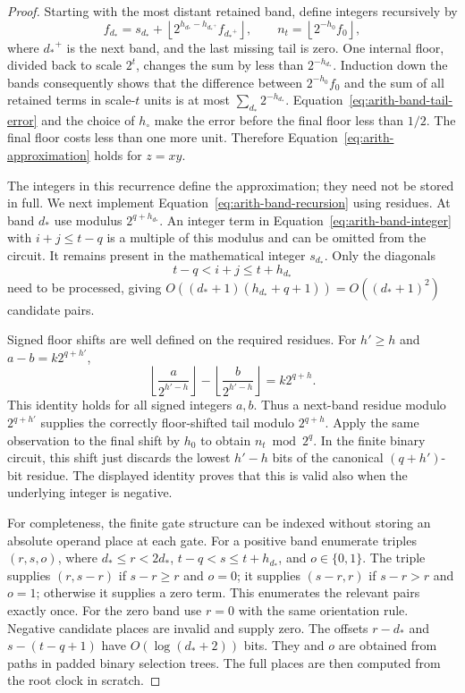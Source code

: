 \documentclass[11pt]{article}
\numberwithin{equation}{section}
\theoremstyle{definition}
\theoremstyle{remark}
\begin{document}
\begin{proof}
Starting with the most distant retained band, define integers
recursively by
\begin{equation}
 {f}_{d_*}={s}_{d_*}+
       \left\lfloor 2^{h_{d_*}-h_{{d_*}^+}}{f}_{{d_*}^+}\right\rfloor,
 \qquad
 {n}_t=\left\lfloor2^{-h_0}{f}_0\right\rfloor,
 \label{eq:arith-band-recursion}
\end{equation}
where ${d_*}^+$ is the next band, and the last missing tail is zero.
One internal floor, divided back to scale $2^t$, changes the sum
by less than $2^{-h_{d_*}}$.  Induction down the bands consequently
shows that the difference between $2^{-h_0}{f}_0$ and the sum of
all retained terms in scale-$t$ units is at most $\sum_{d_*}2^{-h_{d_*}}$.
Equation~\eqref{eq:arith-band-tail-error} and the choice of
$h_\circ$ make the error before the final floor less than $1/2$.
The final floor costs less than one more unit.  Therefore
Equation~\eqref{eq:arith-approximation} holds for $z=xy$.

The integers in this recurrence define the approximation; they need not be stored in full. We next implement Equation~\eqref{eq:arith-band-recursion} using residues.  At band ${d_*}$ use modulus $2^{q+h_{d_*}}$.  An integer term
in Equation~\eqref{eq:arith-band-integer} with $i+j\leq t-q$
is a multiple of this modulus and can be omitted from the circuit.
It remains present in the mathematical integer ${s}_{d_*}$.
Only the diagonals
\begin{equation}
 t-q<i+j\leq t+h_{d_*}
 \label{eq:arith-relevant-diagonals}
\end{equation}
need to be processed, giving
$O(({d_*}+1)(h_{d_*}+q+1))=O(({d_*}+1)^2)$ candidate pairs.

Signed floor shifts are well defined on the required residues.
For $h'\geq h$ and $a-b=k2^{q+h'}$,
\begin{equation}
 \left\lfloor\frac{a}{2^{h'-h}}\right\rfloor
 -\left\lfloor\frac{b}{2^{h'-h}}\right\rfloor
       =k2^{q+h}.
 \label{eq:arith-signed-residue-floor}
\end{equation}
This identity holds for all signed integers $a,b$.  Thus a next-band
residue modulo $2^{q+h'}$ supplies the correctly floor-shifted
tail modulo $2^{q+h}$.  Apply the same observation to the final
shift by $h_0$ to obtain ${n}_t\bmod2^q$.
In the finite binary circuit, this shift just discards the lowest
$h'-h$ bits of the canonical $(q+h')$-bit residue.  The displayed
identity proves that this is valid also when the underlying integer
is negative.

For completeness, the finite gate structure can be indexed without
storing an absolute operand place at each gate.  For a positive
band enumerate triples $(r,s,o)$, where
${d_*}\leq r<2{d_*}$, $t-q<s\leq t+h_{d_*}$, and $o\in\{0,1\}$.
The triple supplies $(r,s-r)$ if $s-r\geq r$ and $o=0$;
it supplies $(s-r,r)$ if $s-r>r$ and $o=1$; otherwise it supplies
a zero term.  This enumerates the relevant pairs exactly once.
For the zero band use $r=0$ with the same orientation rule.
Negative candidate places are invalid and supply zero.
The offsets $r-{d_*}$ and $s-(t-q+1)$ have $O(\log({d_*}+2))$ bits.
They and $o$ are obtained from paths in padded binary selection trees.
The full places are then computed from the root clock in scratch.


\end{proof}
\end{document}
